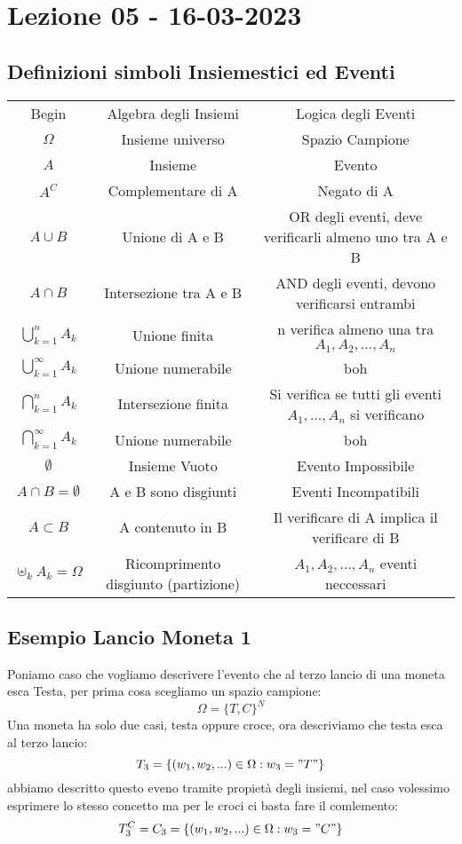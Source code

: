 \section{Lezione 05 - 16-03-2023}

\subsection{Definizioni simboli Insiemestici ed Eventi}
\begin{center}

\begin{tabular}{ |c|c|c| } 
 \hline
 Begin & Algebra degli Insiemi & Logica degli Eventi \\ 
 $\Omega$ & Insieme universo & Spazio Campione \\ 
 $A$ & Insieme & Evento \\
 $A^C$ & Complementare di A & Negato di A \\
 $A \cup B$ & Unione di A e B & OR degli eventi, deve verificarli almeno uno tra A e B \\
 $ A \cap B $ & Intersezione tra A e B & AND degli eventi, devono verificarsi entrambi \\
 $ \bigcup_{k=1}^n A_k $ & Unione finita & n verifica almeno una tra $A_1, A_2,...,A_n$ \\
 $ \bigcup_{k=1}^{\infty} A_k $ & Unione numerabile & boh \\
 $ \bigcap_{k=1}^n A_k$ & Intersezione finita & Si verifica se tutti gli eventi $A_1,...,A_n$ si verificano \\
 $ \bigcap_{k=1}^{\infty} A_k$ & Unione numerabile & boh  \\
 $ \emptyset $ & Insieme Vuoto & Evento Impossibile \\
 $ A \cap B = \emptyset $ & A e B sono disgiunti & Eventi Incompatibili \\
 $ A \subset B $ & A contenuto in B & Il verificare di A implica il verificare di B \\
 $ \uplus_k A_k = \Omega $ & Ricomprimento disgiunto (partizione) & $A_1, A_2,...,A_n$ eventi neccessari\\
 \hline
\end{tabular}

\end{center}


\subsection{Esempio Lancio Moneta 1}
Poniamo caso che vogliamo descrivere l'evento che al terzo lancio di una moneta esca Testa, per prima cosa scegliamo un spazio campione:
$$ \Omega = {\{T,C\}}^{N} $$
Una moneta ha solo due casi, testa oppure croce, ora descriviamo che testa esca al terzo lancio:
$$ T_3 = \{ (w_1,w_2,...) \in \Omega: w_3 = "T" \} $$ 
abbiamo descritto questo eveno tramite propietà degli insiemi, nel caso volessimo esprimere lo stesso concetto ma per le croci ci basta fare il comlemento:
$$ T_3^C = C_3 = \{ (w_1,w_2,...) \in \Omega: w_3 = "C" \}  $$

